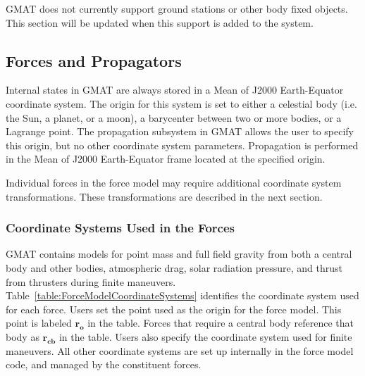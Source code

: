 GMAT does not currently support ground stations or other body fixed objects. This section will be
updated when this support is added to the system.

\subsection{Forces and Propagators}

Internal states in GMAT are always stored in a Mean of J2000 Earth-Equator coordinate system. The
origin for this system is set to either a celestial body (i.e. the Sun, a planet, or a moon), a
barycenter between two or more bodies, or a Lagrange point. The propagation subsystem in GMAT allows
the user to specify this origin, but no other coordinate system parameters. Propagation is performed
in the Mean of J2000 Earth-Equator frame located at the specified origin.

Individual forces in the force model may require additional coordinate system transformations. These
transformations are described in the next section.

\subsubsection{Coordinate Systems Used in the Forces }

GMAT contains models for point mass and full field gravity from both a central body and other
bodies, atmospheric drag, solar radiation pressure, and thrust from thrusters during finite
maneuvers. Table~\ref{table:ForceModelCoordinateSystems} identifies the coordinate system used for
each force. Users set the point used as the origin for the force model. This point is labeled
$\mathbf{r_{o}}$ in the table. Forces that require a central body reference that body as
$\mathbf{r_{cb}}$ in the table. Users also specify the coordinate system used for finite maneuvers.
All other coordinate systems are set up internally in the force model code, and managed by the
constituent forces.

